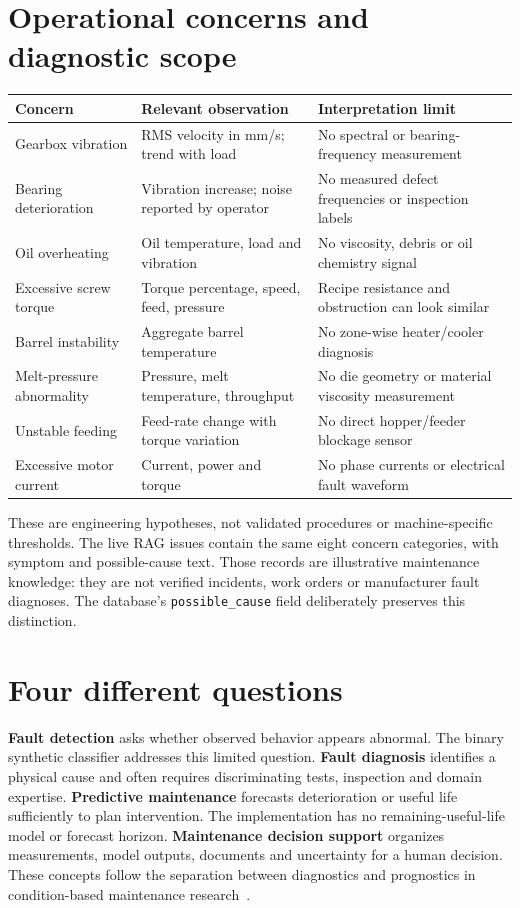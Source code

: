 \section{Operational concerns and diagnostic scope}
\par\smallskip\noindent\begin{tabularx}{\linewidth}{@{}p{.27\linewidth}XX@{}}\toprule
Concern & Relevant observation & Interpretation limit\\\midrule
Gearbox vibration & RMS velocity in mm/s; trend with load & No spectral or bearing-frequency measurement\\
Bearing deterioration & Vibration increase; noise reported by operator & No measured defect frequencies or inspection labels\\
Oil overheating & Oil temperature, load and vibration & No viscosity, debris or oil chemistry signal\\
Excessive screw torque & Torque percentage, speed, feed, pressure & Recipe resistance and obstruction can look similar\\
Barrel instability & Aggregate barrel temperature & No zone-wise heater/cooler diagnosis\\
Melt-pressure abnormality & Pressure, melt temperature, throughput & No die geometry or material viscosity measurement\\
Unstable feeding & Feed-rate change with torque variation & No direct hopper/feeder blockage sensor\\
Excessive motor current & Current, power and torque & No phase currents or electrical fault waveform\\\bottomrule
\end{tabularx}\par\smallskip
These are engineering hypotheses, not validated procedures or machine-specific thresholds. The live RAG issues contain the same eight concern categories, with symptom and possible-cause text. Those records are illustrative maintenance knowledge: they are not verified incidents, work orders or manufacturer fault diagnoses. The database's \texttt{possible\_cause} field deliberately preserves this distinction.
\section{Four different questions}
\textbf{Fault detection} asks whether observed behavior appears abnormal. The binary synthetic classifier addresses this limited question. \textbf{Fault diagnosis} identifies a physical cause and often requires discriminating tests, inspection and domain expertise. \textbf{Predictive maintenance} forecasts deterioration or useful life sufficiently to plan intervention. The implementation has no remaining-useful-life model or forecast horizon. \textbf{Maintenance decision support} organizes measurements, model outputs, documents and uncertainty for a human decision. These concepts follow the separation between diagnostics and prognostics in condition-based maintenance research~\cite{jardine}.
